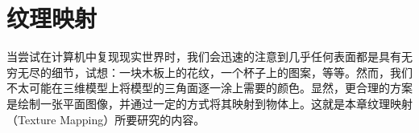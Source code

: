 \chapter{纹理映射}
当尝试在计算机中复现现实世界时，我们会迅速的注意到几乎任何表面都是具有无穷无尽的细节，试想：一块木板上的花纹，一个杯子上的图案，等等。然而，我们不太可能在三维模型上将模型的三角面逐一涂上需要的颜色。显然，更合理的方案是绘制一张平面图像，并通过一定的方式将其映射到物体上。这就是本章纹理映射（Texture Mapping）所要研究的内容。




